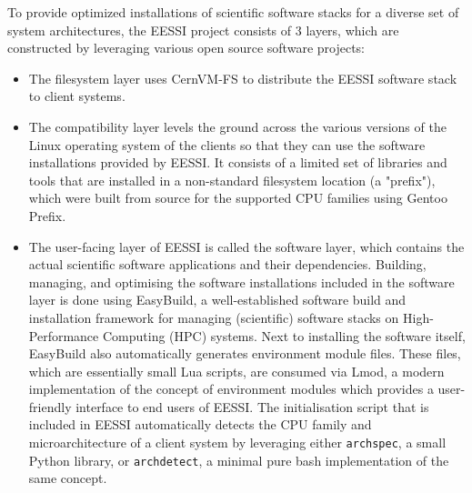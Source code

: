 To provide optimized installations of scientific software stacks for a diverse set of system architectures, the EESSI
project consists of 3 layers, which are constructed by leveraging various open source software projects:
\begin{itemize}
\item The filesystem layer uses CernVM-FS to distribute the EESSI software stack to client systems.
\item The compatibility layer levels the ground across the various versions of the Linux operating system
      of the clients so that they can use the software installations provided by EESSI. It consists of a limited set of libraries
      and tools that are installed in a non-standard filesystem location (a "prefix"), which were built from source for
      the supported CPU families using Gentoo Prefix.
\item The user-facing layer of EESSI is called the software layer, which contains the actual scientific software applications
      and their dependencies. Building, managing, and optimising the software installations included in the software
      layer is done using EasyBuild, a well-established software build and installation framework for managing
      (scientific) software stacks on High-Performance Computing (HPC) systems. Next to installing the software itself,
      EasyBuild also automatically generates environment module files. These files, which are essentially small Lua
      scripts, are consumed via Lmod, a modern implementation of the concept of environment modules which provides a
      user-friendly interface to end users of EESSI. The initialisation script that is included in EESSI
      automatically detects the CPU family and microarchitecture of a client system by leveraging either
      \texttt{archspec}, a small Python library, or \texttt{archdetect}, a minimal pure bash implementation of the same
      concept.
\end{itemize}


